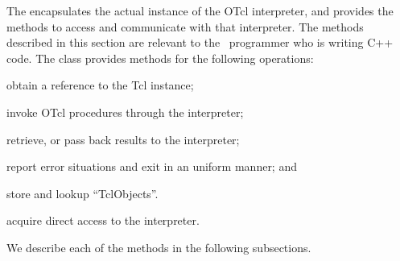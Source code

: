 The  encapsulates the actual instance of
the OTcl interpreter, and provides the methods
to access and communicate with that interpreter.
The methods described in this section are relevant to the
\ns\ programmer who is writing C++ code.
The class provides methods for the following operations:
\begin{list}{\textbullet}{}\itemsep0pt
\item obtain a reference to the Tcl instance;
\item invoke OTcl procedures through the interpreter;
\item retrieve, or pass back results to the interpreter;
\item report error situations and exit in an uniform manner; and
\item store and lookup ``TclObjects''.
\item acquire direct access to the interpreter.
\end{list}
We describe each of the methods in the following subsections.

